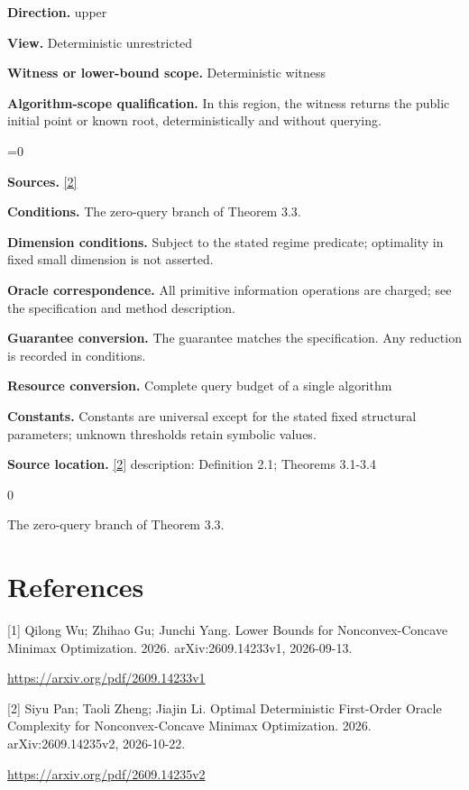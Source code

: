 \documentclass[10pt,a4paper]{article}
\newcommand{\AtlasMath}[1]{\par\begingroup\centering\setbox0=\hbox{$\displaystyle #1$}\ifdim\wd0>1.4\linewidth\typeout{ATLAS WIDE FORMULA: \the\wd0}\fi\ifdim\wd0>\linewidth\resizebox{\linewidth}{!}{\box0}\else\box0\fi\par\endgroup}
\begin{document}
\textbf{Direction.} upper

\textbf{View.} Deterministic unrestricted

\textbf{Witness or lower-bound scope.} Deterministic witness

\textbf{Algorithm-scope qualification.} In this region, the witness returns the public initial point or known root, deterministically and without querying.

\AtlasMath{0}
\textbf{Sources.} \href{https://arxiv.org/pdf/2609.14235v2}{[2]}

\textbf{Conditions.} The zero-query branch of Theorem 3.3.

\textbf{Dimension conditions.} Subject to the stated regime predicate; optimality in fixed small dimension is not asserted.

\textbf{Oracle correspondence.} All primitive information operations are charged; see the specification and method description.

\textbf{Guarantee conversion.} The guarantee matches the specification. Any reduction is recorded in conditions.

\textbf{Resource conversion.} Complete query budget of a single algorithm

\textbf{Constants.} Constants are universal except for the stated fixed structural parameters; unknown thresholds retain symbolic values.

\textbf{Source location.} \href{https://arxiv.org/pdf/2609.14235v2}{[2]} description: Definition 2.1; Theorems 3.1-3.4

0

The zero-query branch of Theorem 3.3.

\section{References}
[1] Qilong Wu; Zhihao Gu; Junchi Yang. Lower Bounds for Nonconvex-Concave Minimax Optimization. 2026. arXiv:2609.14233v1, 2026-09-13.

\url{https://arxiv.org/pdf/2609.14233v1}

[2] Siyu Pan; Taoli Zheng; Jiajin Li. Optimal Deterministic First-Order Oracle Complexity for Nonconvex-Concave Minimax Optimization. 2026. arXiv:2609.14235v2, 2026-10-22.

\url{https://arxiv.org/pdf/2609.14235v2}
\end{document}
